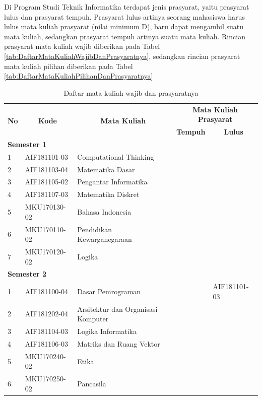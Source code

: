 Di Program Studi Teknik Informatika terdapat jenis prasyarat, yaitu prasyarat lulus dan prasyarat tempuh. Prasyarat lulus artinya seorang mahasiswa harus lulus mata kuliah prasyarat (nilai minimum D), baru dapat mengambil suatu mata kuliah, sedangkan prasyarat tempuh artinya suatu mata kuliah. Rincian prasyarat mata kuliah wajib diberikan pada Tabel \ref{tab:DaftarMataKuliahWajibDanPrasyaratnya}, sedangkan rincian prasyarat mata kuliah pilihan diberikan pada Tabel \ref{tab:DaftarMataKuliahPilihanDanPrasyaratnya}

\begin{table}[H]
	\centering
		\caption{Daftar mata kuliah wajib dan prasyaratnya}
		\begin{tabular}{|p{0.5cm}|p{2.85cm}|p{4.95cm}|p{2.7cm}|p{2.7cm}|}
			\hline
			\multicolumn{1}{|c|}{\multirow{2}{*}{\textbf{No}}} & \multicolumn{1}{c|}{\multirow{2}{*}{\textbf{Kode}}} & \multicolumn{1}{c|}{\multirow{2}{*}{\textbf{Mata Kuliah}}} & \multicolumn{2}{c|}{\textbf{Mata Kuliah Prasyarat}} \\ \cline{4-5}
			 &  &  & \multicolumn{1}{c|}{\textbf{Tempuh}} & \multicolumn{1}{c|}{\textbf{Lulus}} \\ \hline
			\multicolumn{5}{|l|}{\textbf{Semester 1}} \\ \hline
1 & AIF181101-03 & Computational Thinking &  &  \\ \hline
2 & AIF181103-04 & Matematika Dasar &  &  \\ \hline
3 & AIF181105-02 & Pengantar Informatika &  &  \\ \hline
4 & AIF181107-03 & Matematika Diskret &  &  \\ \hline
5 & MKU170130-02 & Bahasa Indonesia &  &  \\ \hline
6 & MKU170110-02 & Pendidikan Kewarganegaraan &  &  \\ \hline
7 & MKU170120-02 & Logika &  &  \\ \hline
\multicolumn{5}{|l|}{\textbf{Semester 2}} \\ \hline
1 & AIF181100-04 & Dasar Pemrograman &  & AIF181101-03 \\ \hline
2 & AIF181202-04 & Arsitektur dan Organisasi Komputer &  &  \\ \hline
3 & AIF181104-03 & Logika Informatika &  &  \\ \hline
4 & AIF181106-03 & Matriks dan Ruang Vektor &  &  \\ \hline
5 & MKU170240-02 & Etika &  &  \\ \hline
6 & MKU170250-02 & Pancasila &  &  \\ \hline

\end{tabular}
\end{table}
